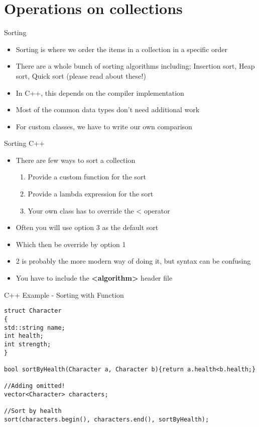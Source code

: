 \part{Operations on collections}
\frame{\partpage}

\begin{frame}{Sorting}
	\begin{itemize}
		\pause \item Sorting is where we order the items in a collection in a specific order
		\pause \item There are a whole bunch of sorting algorithms including; Insertion sort, Heap sort, Quick sort (please read about these!)
		\pause \item In C++, this depends on the compiler implementation 
		\pause \item Most of the common data types don't need additional work
		\pause \item For custom classes, we have to write our own comparison
	\end{itemize}
\end{frame}

\begin{frame}{Sorting C++}
\begin{itemize}
	\pause \item There are few ways to sort a collection
	\begin{enumerate}
		\pause \item Provide a custom function for the sort
		\pause \item Provide a lambda expression for the sort
		\pause \item Your own class has to override the < operator
	\end{enumerate}
	\pause \item Often you will use option 3 as the default sort
	\pause \item Which then be override by option 1 
	\pause \item 2 is probably the more modern way of doing it, but syntax can be confusing
	\pause \item You have to include the \textbf{<algorithm>} header file
\end{itemize}
\end{frame}

\begin{frame}[fragile]{C++ Example - Sorting with Function }
\begin{lstlisting}
struct Character
{
std::string name;
int health;
int strength;
}

bool sortByHealth(Character a, Character b){return a.health<b.health;}

//Adding omitted!
vector<Character> characters;

//Sort by health
sort(characters.begin(), characters.end(), sortByHealth);
\end{lstlisting}
\end{frame}

